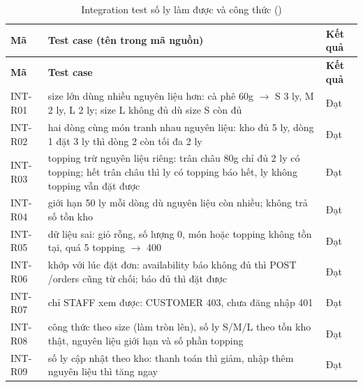 {\small
\begin{longtable}{@{}L{1.9cm}L{10.6cm}L{1.3cm}@{}}
\caption{Integration test số ly làm được và công thức ()}\label{tab:intr}\\
\toprule
\textbf{Mã} & \textbf{Test case (tên trong mã nguồn)} & \textbf{Kết quả} \\ \midrule \endfirsthead
\toprule \textbf{Mã} & \textbf{Test case} & \textbf{Kết quả} \\ \midrule \endhead
\bottomrule \endfoot
INT-R01 & size lớn dùng nhiều nguyên liệu hơn: cà phê 60g $\rightarrow$ S 3 ly, M 2 ly, L 2 ly; size L không đủ dù size S còn đủ & Đạt \\
INT-R02 & hai dòng cùng món tranh nhau nguyên liệu: kho đủ 5 ly, dòng 1 đặt 3 ly thì dòng 2 còn tối đa 2 ly & Đạt \\
INT-R03 & topping trừ nguyên liệu riêng: trân châu 80g chỉ đủ 2 ly có topping; hết trân châu thì ly có topping báo hết, ly không topping vẫn đặt được & Đạt \\
INT-R04 & giới hạn 50 ly mỗi dòng dù nguyên liệu còn nhiều; không trả số tồn kho & Đạt \\
INT-R05 & dữ liệu sai: giỏ rỗng, số lượng 0, món hoặc topping không tồn tại, quá 5 topping $\rightarrow$ 400 & Đạt \\
INT-R06 & khớp với lúc đặt đơn: availability báo không đủ thì POST /orders cũng từ chối; báo đủ thì đặt được & Đạt \\
INT-R07 & chỉ STAFF xem được: CUSTOMER 403, chưa đăng nhập 401 & Đạt \\
INT-R08 & công thức theo size (làm tròn lên), số ly S/M/L theo tồn kho thật, nguyên liệu giới hạn và số phần topping & Đạt \\
INT-R09 & số ly cập nhật theo kho: thanh toán thì giảm, nhập thêm nguyên liệu thì tăng ngay & Đạt \\
\end{longtable}
}